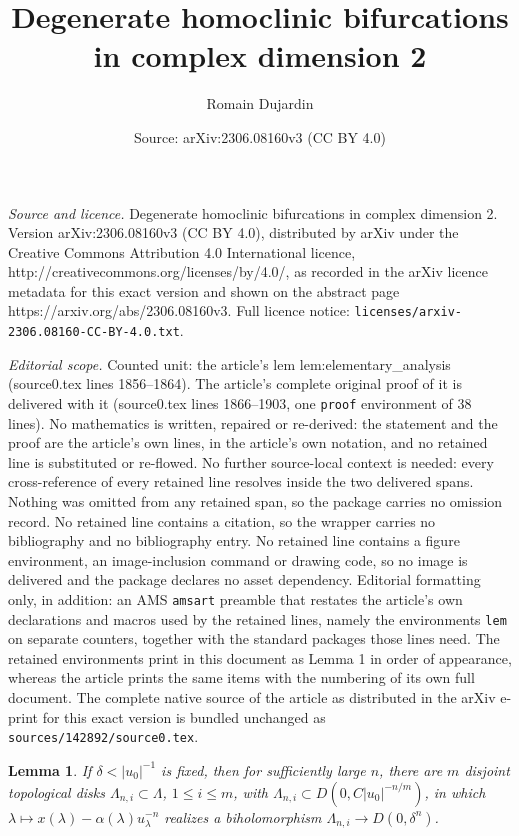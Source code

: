 \documentclass[10pt,a4paper]{amsart}
\title{Degenerate homoclinic bifurcations in complex dimension 2}
\author{Romain Dujardin}
\date{Source: arXiv:2306.08160v3 (CC BY 4.0)}
\newtheorem{lem}{Lemma}
\newcommand{\abs}[1]{\left\vert#1\right\vert}
\newcommand{\inv}{^{-1}}
\begin{document}
\maketitle

\noindent\emph{Source and licence.} Degenerate homoclinic bifurcations in complex dimension 2. Version arXiv:2306.08160v3 (CC BY 4.0), distributed by arXiv under the Creative Commons Attribution 4.0 International licence, http://creativecommons.org/licenses/by/4.0/, as recorded in the arXiv licence metadata for this exact version and shown on the abstract page https://arxiv.org/abs/2306.08160v3. Full licence notice: \texttt{licenses/arxiv-2306.08160-CC-BY-4.0.txt}.\par\smallskip

\noindent\textit{Editorial scope.} Counted unit: the article's lem lem:elementary\_analysis (source0.tex lines 1856--1864). The article's complete original proof of it is delivered with it (source0.tex lines 1866--1903, one \texttt{proof} environment of 38 lines). No mathematics is written, repaired or re-derived: the statement and the proof are the article's own lines, in the article's own notation, and no retained line is substituted or re-flowed.  No further source-local context is needed: every cross-reference of every retained line resolves inside the two delivered spans.  Nothing was omitted from any retained span, so the package carries no omission record.  No retained line contains a citation, so the wrapper carries no bibliography and no bibliography entry.  No retained line contains a figure environment, an image-inclusion command or drawing code, so no image is delivered and the package declares no asset dependency.  Editorial formatting only, in addition: an AMS \texttt{amsart} preamble that restates the article's own declarations and macros used by the retained lines, namely the environments \texttt{lem} on separate counters, together with the standard packages those lines need.  The retained environments print in this document as Lemma 1 in order of appearance, whereas the article prints the same items with the numbering of its own full document.  The complete native source of the article as distributed in the arXiv e-print for this exact version is bundled unchanged as \texttt{sources/142892/source0.tex}.
\begin{lem}\label{lem:elementary_analysis}
If  $ \delta < \abs{u_0}\inv$   is fixed, then  for 
  sufficiently large $n$,  there are $m$ disjoint topological disks $\Lambda_{n, i}\subset \Lambda$, 
  $1\leq i\leq m$, with $\Lambda_{n, i} \subset D(0, C \abs{u_0}^{-n/m})$, 
  in which 
$\lambda \mapsto x(\lambda ) - \alpha(\lambda) u_\lambda^{-n} $ realizes a 
biholomorphism
$\Lambda_{n, i}\to D(0, \delta^n)$. 
\end{lem}
\end{document}
